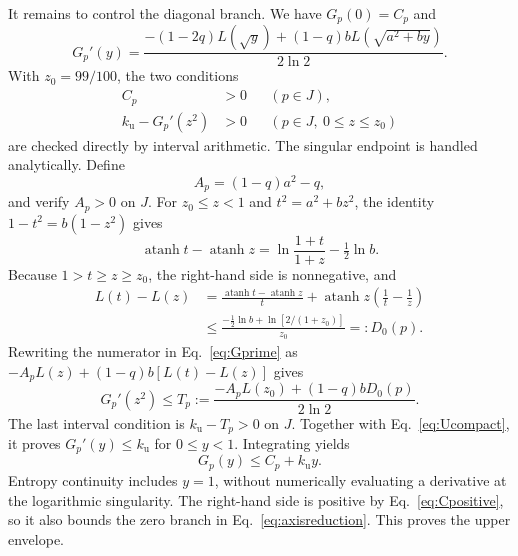\documentclass[aps,pra,reprint,amsmath,amssymb,longbibliography,nofootinbib]{revtex4-2}
\newcommand{\atanh}{\operatorname{atanh}}
\newcommand{\ku}{k_{\mathrm u}}
\begin{document}
It remains to control the diagonal branch. We have $G_p(0)=C_p$ and
\begin{equation}
 G_p'(y)=\frac{-(1-2q)L(\sqrt y)
                  +(1-q)bL(\sqrt{a^2+by})}{2\ln2}.
 \label{eq:Gprime}
\end{equation}
With $z_0=99/100$, the two conditions
\begin{align}
 C_p&>0&&(p\in J),\label{eq:Cpositive}\\
 \ku-G_p'(z^2)&>0&&(p\in J,\ 0\le z\le z_0)
 \label{eq:Ucompact}
\end{align}
are checked directly by interval arithmetic. The singular endpoint is handled analytically. Define
\begin{equation}
 A_p=(1-q)a^2-q,
 \label{eq:A}
\end{equation}
and verify $A_p>0$ on $J$. For $z_0\le z<1$ and $t^2=a^2+bz^2$, the identity $1-t^2=b(1-z^2)$ gives
\begin{equation}
 \atanh t-\atanh z=\ln\frac{1+t}{1+z}-\tfrac12\ln b.
 \label{eq:atanhtail}
\end{equation}
Because $1>t\ge z\ge z_0$, the right-hand side is nonnegative, and
\begin{align}
 L(t)-L(z)&=\frac{\atanh t-\atanh z}{t}
                +\atanh z\left(\frac1t-\frac1z\right)\nonumber\\
 &\le\frac{-\tfrac12\ln b+\ln[2/(1+z_0)]}{z_0}
       =:D_0(p).
 \label{eq:D0}
\end{align}
Rewriting the numerator in Eq.~\eqref{eq:Gprime} as
$-A_pL(z)+(1-q)b[L(t)-L(z)]$ gives
\begin{equation}
 G_p'(z^2)\le T_p:=
 \frac{-A_pL(z_0)+(1-q)bD_0(p)}{2\ln2}.
 \label{eq:tailbound}
\end{equation}
The last interval condition is $\ku-T_p>0$ on $J$. Together with Eq.~\eqref{eq:Ucompact}, it proves $G_p'(y)\le\ku$ for $0\le y<1$. Integrating yields
\begin{equation}
 G_p(y)\le C_p+\ku y.
 \label{eq:Gupper}
\end{equation}
Entropy continuity includes $y=1$, without numerically evaluating a derivative at the logarithmic singularity. The right-hand side is positive by Eq.~\eqref{eq:Cpositive}, so it also bounds the zero branch in Eq.~\eqref{eq:axisreduction}. This proves the upper envelope.
\end{document}

